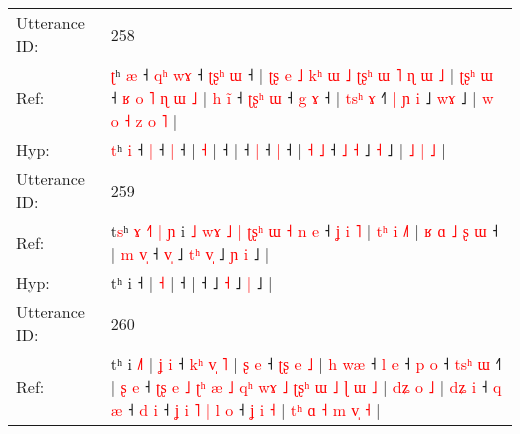 \documentclass[10pt]{article}
\DeclareRobustCommand{\hl}[1]{{\textcolor{red}{#1}}}
\begin{document}
\begin{longtable}{ll}
\midrule
Utterance ID: & 258 \\
Ref: & \hl{ʈ}ʰ \hl{æ} ˧\hl{ }\hl{q}\hl{ʰ} \hl{w}\hl{ɤ} ˧\hl{ }\hl{ʈ}\hl{ʂ}\hl{ʰ} \hl{ɯ} ˧ |\hl{ }\hl{ʈ}\hl{ʂ}\hl{ }\hl{e}\hl{ }\hl{˩}\hl{ }\hl{k}\hl{ʰ}\hl{ }\hl{ɯ}\hl{ }\hl{˩}\hl{ }\hl{ʈ}\hl{ʂ}\hl{ʰ}\hl{ }\hl{ɯ}\hl{ }\hl{˥}\hl{ }\hl{ɳ}\hl{ }\hl{ɯ} \hl{˩} |\hl{ }\hl{ʈ}\hl{ʂ}\hl{ʰ}\hl{ }\hl{ɯ} ˧\hl{ }\hl{ʁ}\hl{ }\hl{o}\hl{ }\hl{˥}\hl{ }\hl{ɳ}\hl{ }\hl{ɯ}\hl{ }\hl{˩} |\hl{ }\hl{h}\hl{ }\hl{i}\hl{̃} ˧\hl{ }\hl{ʈ}\hl{ʂ}\hl{ʰ} \hl{ɯ} ˧\hl{ }\hl{g} \hl{ɤ} ˧ | \hl{t}\hl{s}\hl{ʰ} \hl{ɤ} ˧\hl{˥}\hl{ }\hl{|} \hl{ɲ} \hl{i} ˩ \hl{w}\hl{ɤ} ˩ |\hl{ }\hl{w}\hl{ }\hl{o}\hl{ }\hl{˧} \hl{z} \hl{o} \hl{˥} |
 \\
Hyp: & \hl{t}ʰ \hl{i} ˧\hl{}\hl{}\hl{} \hl{}\hl{|} ˧\hl{}\hl{}\hl{}\hl{} \hl{|} ˧ |\hl{}\hl{}\hl{}\hl{}\hl{}\hl{}\hl{}\hl{}\hl{}\hl{}\hl{}\hl{}\hl{}\hl{}\hl{}\hl{}\hl{}\hl{}\hl{}\hl{}\hl{}\hl{}\hl{}\hl{}\hl{}\hl{} \hl{˧} |\hl{}\hl{}\hl{}\hl{}\hl{}\hl{} ˧\hl{}\hl{}\hl{}\hl{}\hl{}\hl{}\hl{}\hl{}\hl{}\hl{}\hl{}\hl{} |\hl{}\hl{}\hl{}\hl{}\hl{} ˧\hl{}\hl{}\hl{}\hl{} \hl{|} ˧\hl{}\hl{} \hl{|} ˧ | \hl{}\hl{}\hl{˧} \hl{˩} ˧\hl{}\hl{}\hl{} \hl{˩} \hl{˧} ˩ \hl{}\hl{˧} ˩ |\hl{}\hl{}\hl{}\hl{}\hl{}\hl{} \hl{˩} \hl{|} \hl{˩} |
 \\
\midrule
Utterance ID: & 259 \\
Ref: & t\hl{s}ʰ\hl{ }\hl{ɤ}\hl{ }\hl{˧}\hl{˥}\hl{ }\hl{|}\hl{ }\hl{ɲ} i\hl{ }\hl{˩}\hl{ }\hl{w}\hl{ɤ}\hl{ }\hl{˩}\hl{ }\hl{|}\hl{ }\hl{ʈ}\hl{ʂ}\hl{ʰ}\hl{ }\hl{ɯ}\hl{ }\hl{˧}\hl{ }\hl{n}\hl{ }\hl{e} ˧\hl{ }\hl{ʝ}\hl{ }\hl{i}\hl{ }\hl{˥} |\hl{ }\hl{t}\hl{ʰ}\hl{ }\hl{i} \hl{˩}\hl{˥} |\hl{ }\hl{ʁ}\hl{ }\hl{ɑ}\hl{ }\hl{˩}\hl{ }\hl{ʂ}\hl{ }\hl{ɯ} ˧ |\hl{ }\hl{m}\hl{ }\hl{v}\hl{̩} ˧\hl{ }\hl{v}\hl{̩} ˩\hl{ }\hl{t}\hl{ʰ} \hl{v}\hl{̩} ˩\hl{ }\hl{ɲ} \hl{i} ˩ |
 \\
Hyp: & t\hl{}ʰ\hl{}\hl{}\hl{}\hl{}\hl{}\hl{}\hl{}\hl{}\hl{} i\hl{}\hl{}\hl{}\hl{}\hl{}\hl{}\hl{}\hl{}\hl{}\hl{}\hl{}\hl{}\hl{}\hl{}\hl{}\hl{}\hl{}\hl{}\hl{}\hl{}\hl{} ˧\hl{}\hl{}\hl{}\hl{}\hl{}\hl{} |\hl{}\hl{}\hl{}\hl{}\hl{} \hl{}\hl{˧} |\hl{}\hl{}\hl{}\hl{}\hl{}\hl{}\hl{}\hl{}\hl{}\hl{} ˧ |\hl{}\hl{}\hl{}\hl{}\hl{} ˧\hl{}\hl{}\hl{} ˩\hl{}\hl{}\hl{} \hl{}\hl{˧} ˩\hl{}\hl{} \hl{|} ˩ |
 \\
\midrule
Utterance ID: & 260 \\
Ref: & tʰ i \hl{˩}\hl{˥} |\hl{ }\hl{ʝ}\hl{ }\hl{i} ˧\hl{ }\hl{k}\hl{ʰ}\hl{ }\hl{v}\hl{̩}\hl{ }\hl{˥} |\hl{ }\hl{ʂ}\hl{ }\hl{e} ˧\hl{ }\hl{ʈ}\hl{ʂ}\hl{ }\hl{e}\hl{ }\hl{˩} |\hl{ }\hl{h}\hl{ }\hl{w}\hl{æ} ˧\hl{ }\hl{l} \hl{e} ˧\hl{ }\hl{p} \hl{o} ˧\hl{ }\hl{t}\hl{s}\hl{ʰ} \hl{ɯ} ˧\hl{˥} |\hl{ }\hl{ʂ}\hl{ }\hl{e} ˧\hl{ }\hl{ʈ}\hl{ʂ}\hl{ }\hl{e}\hl{ }\hl{˩}\hl{ }\hl{ʈ}\hl{ʰ}\hl{ }\hl{æ}\hl{ }\hl{˩}\hl{ }\hl{q}\hl{ʰ}\hl{ }\hl{w}\hl{ɤ}\hl{ }\hl{˩}\hl{ }\hl{ʈ}\hl{ʂ}\hl{ʰ}\hl{ }\hl{ɯ}\hl{ }\hl{˩}\hl{ }\hl{ɭ}\hl{ }\hl{ɯ}\hl{ }\hl{˩} |\hl{ }\hl{d}\hl{ʑ}\hl{ }\hl{o} \hl{˩} |\hl{ }\hl{d}\hl{ʑ}\hl{ }\hl{i} ˧\hl{ }\hl{q} \hl{æ} ˧\hl{ }\hl{d} \hl{i} ˧\hl{ }\hl{ʝ}\hl{ }\hl{i}\hl{ }\hl{˥}\hl{ }\hl{|}\hl{ }\hl{l} \hl{o} ˧\hl{ }\hl{ʝ}\hl{ }\hl{i} \hl{˧} |\hl{ }\hl{t}\hl{ʰ}\hl{ }\hl{ɑ}\hl{ }\hl{˧} \hl{m} \hl{v}\hl{̩} \hl{˧} |

\end{longtable}
\end{document}

